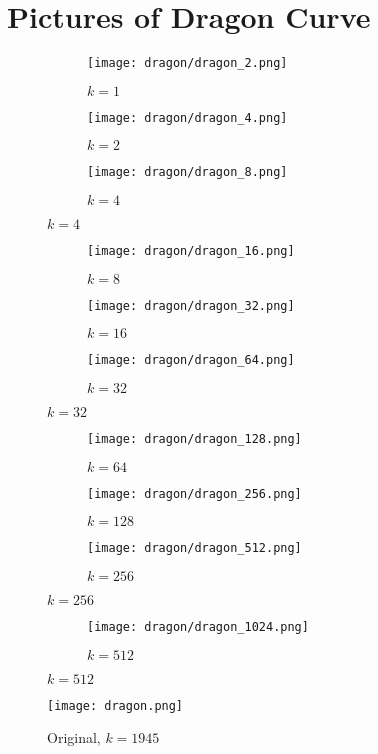 \documentclass{article}
\begin{document}
\section{Pictures of Dragon Curve}
\begin{figure}[H]
  \begin{subfigure}{.32\textwidth}
    \centering
    \texttt{[image: dragon/dragon\_2.png]}
    \caption{$k=1$}
  \end{subfigure}
  \begin{subfigure}{.32\textwidth}
    \centering
    \texttt{[image: dragon/dragon\_4.png]}
    \caption{$k=2$}
  \end{subfigure}
  \begin{subfigure}{.32\textwidth}
    \centering
    \texttt{[image: dragon/dragon\_8.png]}
    \caption{$k=4$}
  \end{subfigure}
\end{figure}
\begin{figure}[H]
  \begin{subfigure}{.32\textwidth}
    \centering
    \texttt{[image: dragon/dragon\_16.png]}
    \caption{$k=8$}
  \end{subfigure}
  \begin{subfigure}{.32\textwidth}
    \centering
    \texttt{[image: dragon/dragon\_32.png]}
    \caption{$k=16$}
  \end{subfigure}
  \begin{subfigure}{.32\textwidth}
    \centering
    \texttt{[image: dragon/dragon\_64.png]}
    \caption{$k=32$}
  \end{subfigure}
\end{figure}
\begin{figure}[H]
  \begin{subfigure}{.32\textwidth}
    \centering
    \texttt{[image: dragon/dragon\_128.png]}
    \caption{$k=64$}
  \end{subfigure}
  \begin{subfigure}{.32\textwidth}
    \centering
    \texttt{[image: dragon/dragon\_256.png]}
    \caption{$k=128$}
  \end{subfigure}
  \begin{subfigure}{.32\textwidth}
    \centering
    \texttt{[image: dragon/dragon\_512.png]}
    \caption{$k=256$}
  \end{subfigure}
\end{figure}
\begin{figure}[H]
  \begin{subfigure}{.32\textwidth}
    \centering
    \texttt{[image: dragon/dragon\_1024.png]}
    \caption{$k=512$}
  \end{subfigure}
\end{figure}
\begin{figure}[H]
  \centering
  \texttt{[image: dragon.png]}
  \caption{Original, $k=1945$}
\end{figure}
\end{document}
